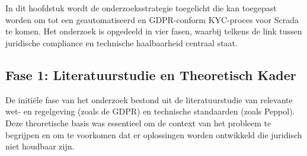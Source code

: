 
\chapter{}%
\label{ch:methodologie}


In dit hoofdstuk wordt de onderzoeksstrategie toegelicht die kan toegepast worden om tot een geautomatiseerd en GDPR-conform KYC-proces voor Scrada te komen. 
Het onderzoek is opgedeeld in vier fasen, waarbij telkens de link tussen juridische compliance en technische haalbaarheid centraal staat.

\section{Fase 1: Literatuurstudie en Theoretisch Kader}
De initiële fase van het onderzoek bestond uit de literatuurstudie van relevante wet- en regelgeving (zoals de GDPR) en technische standaarden (zoals Peppol). \\
Deze theoretische basis was essentieel om de context van het probleem te begrijpen en om te voorkomen dat er oplossingen worden ontwikkeld die juridisch niet houdbaar zijn.


